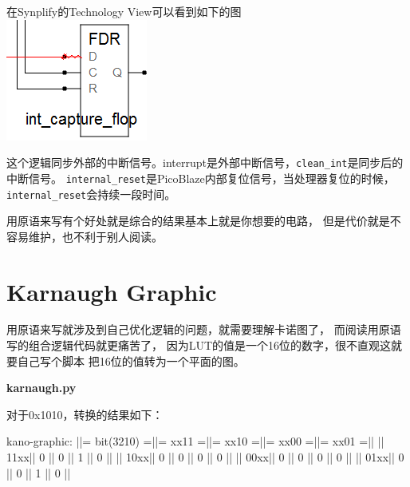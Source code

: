在Synplify的Technology View可以看到如下的图\\
\includegraphics{images/int_capture_flop.png}

这个逻辑同步外部的中断信号。interrupt是外部中断信号，\verb|clean_int|是同步后的中断信号。 \verb|internal_reset|是PicoBlaze内部复位信号，当处理器复位的时候，\verb|internal_reset|会持续一段时间。

用原语来写有个好处就是综合的结果基本上就是你想要的电路，
但是代价就是不容易维护，也不利于别人阅读。

\clearpage
\section{Karnaugh Graphic}
用原语来写就涉及到自己优化逻辑的问题，就需要理解卡诺图了，
而阅读用原语写的组合逻辑代码就更痛苦了，
因为LUT的值是一个16位的数字，很不直观这就要自己写个脚本
把16位的值转为一个平面的图。

\textbf{karnaugh.py}


对于0x1010，转换的结果如下：
\begin{textcode}
kano-graphic:
||= bit(3210) =||=  xx11 =||=  xx10 =||=  xx00 =||=  xx01 =||
||         11xx||      0  ||      0  ||      1  ||      0  ||
||         10xx||      0  ||      0  ||      0  ||      0  ||
||         00xx||      0  ||      0  ||      0  ||      0  ||
||         01xx||      0  ||      0  ||      1  ||      0  ||
\end{textcode}


